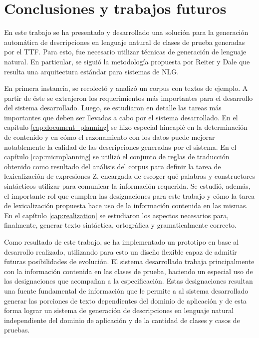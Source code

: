 \chapter{Conclusiones y trabajos futuros}
\label{cap:conclusion}

En este trabajo se ha presentado y desarrollado una solución para la generación automática de descripciones en lenguaje natural de clases de prueba generadas por el TTF. Para esto, fue necesario utilizar técnicas de generación de lenguaje natural. En particular, se siguió la metodología propuesta por Reiter y Dale \cite{reiter_dale} que resulta una arquitectura estándar para sistemas de NLG.

En primera instancia, se recolectó y analizó un corpus con textos de ejemplo. A partir de éste se extrajeron los requerimientos más importantes para el desarrollo del sistema desarrollado. Luego, se estudiaron en detalle las tareas más importantes que deben ser llevadas a cabo por el sistema desarrollado. En el capítulo \ref{cap:document_planning} se hizo especial hincapié en la determinación de contenido y en cómo el razonamiento con los datos puede mejorar notablemente la calidad de las descripciones generadas por el sistema. En el capítulo \ref{cap:microplanning} se utilizó el conjunto de reglas de traducción obtenido como resultado del análisis del corpus para definir la tarea de lexicalización de expresiones Z, encargada de escoger qué palabras y constructores sintácticos utilizar para comunicar la información requerida. Se estudió, además, el importante rol que cumplen las designaciones para este trabajo y cómo la tarea de lexicalización propuesta hace uso de la información contenida en las mismas. En el capítulo \ref{cap:realization} se estudiaron los aspectos necesarios para, finalmente, generar texto sintáctica, ortográfica y gramaticalmente correcto.

Como resultado de este trabajo, se ha implementado un prototipo en base al desarrollo realizado, utilizando para esto un diseño flexible capaz de admitir futuras posibilidades de evolución. El sistema desarrollado trabaja principalmente con la información contenida en las clases de prueba, haciendo un especial uso de las designaciones que acompañan a la especificación. Estas designaciones resultan una fuente fundamental de información que le permite a al sistema desarrollado generar las porciones de texto dependientes del dominio de aplicación y de esta forma lograr un sistema de generación de descripciones en lenguaje natural independiente del dominio de aplicación y de la cantidad de clases y casos de pruebas.

